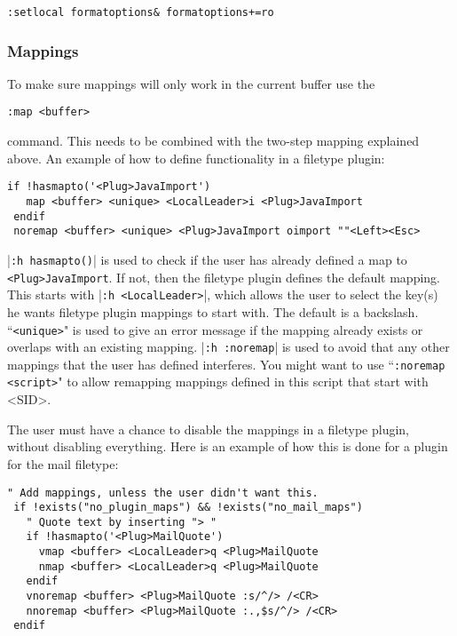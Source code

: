 \begin{Verbatim}[samepage=true]
 :setlocal formatoptions& formatoptions+=ro
\end{Verbatim}

\subsubsection{Mappings}
To make sure mappings will only work in the current buffer use the

\begin{Verbatim}[samepage=true]
 :map <buffer>
\end{Verbatim}

command.
This needs to be combined with the two-step mapping explained above.
An example of how to define functionality in a filetype plugin:

\begin{Verbatim}[samepage=true]
 if !hasmapto('<Plug>JavaImport')
   map <buffer> <unique> <LocalLeader>i <Plug>JavaImport
 endif
 noremap <buffer> <unique> <Plug>JavaImport oimport ""<Left><Esc>
\end{Verbatim}

|\texttt{:h hasmapto()}| is used to check if the user has already defined a map to \texttt{<Plug>JavaImport}.
If not, then the filetype plugin defines the default mapping.
This starts with |\texttt{:h <LocalLeader>}|, which allows the user to select the key(s) he wants filetype plugin mappings to start with.
The default is a backslash.
``\texttt{<unique>}" is used to give an error message if the mapping already exists or overlaps with an existing mapping.
|\texttt{:h :noremap}| is used to avoid that any other mappings that the user has defined interferes.
You might want to use ``\texttt{:noremap <script>}" to allow remapping mappings defined in this script that start with <SID>.

The user must have a chance to disable the mappings in a filetype plugin, without disabling everything.
Here is an example of how this is done for a plugin for the mail filetype:

\begin{Verbatim}[samepage=true]
 " Add mappings, unless the user didn't want this.
 if !exists("no_plugin_maps") && !exists("no_mail_maps")
   " Quote text by inserting "> "
   if !hasmapto('<Plug>MailQuote')
     vmap <buffer> <LocalLeader>q <Plug>MailQuote
     nmap <buffer> <LocalLeader>q <Plug>MailQuote
   endif
   vnoremap <buffer> <Plug>MailQuote :s/^/> /<CR>
   nnoremap <buffer> <Plug>MailQuote :.,$s/^/> /<CR>
 endif
\end{Verbatim}

